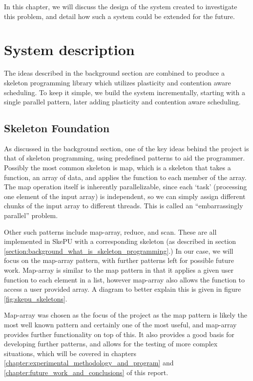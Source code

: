 
In this chapter, we will discuss the design of the system created to investigate this problem, and detail how such a system could be extended for the future.



\section{System description}

The ideas described in the background section are combined to produce a skeleton programming library which utilizes plasticity and contention aware scheduling. To keep it simple, we build the system incrementally, starting with a single parallel pattern, later adding plasticity and contention aware scheduling. 



\subsection{Skeleton Foundation}
\label{section:design_skeleton_foundation}

As discussed in the background section, one of the key ideas behind the project is that of skeleton programming, using predefined patterns to aid the programmer. Possibly the most common skeleton is map, which is a skeleton that takes a function, an array of data, and applies the function to each member of the array. The map operation itself is inherently parallelizable, since each `task' (processing one element of the input array) is independent, so we can simply assign different chunks of the input array to different threads. This is called an ``embarrassingly parallel'' problem. 

Other such patterns include map-array, reduce, and scan. These are all implemented in SkePU with a corresponding skeleton (as described in section \ref{section:background_what_is_skeleton_programming}.) In our case, we will focus on the map-array pattern, with further patterns left for possible future work. Map-array is similar to the map pattern in that it applies a given user function to each element in a list, however map-array also allows the function to access a user provided array. A diagram to better explain this is given in figure \ref{fig:skepu_skeletons}.

Map-array was chosen as the focus of the project as the map pattern is likely the most well known pattern and certainly one of the most useful, and map-array provides further functionality on top of this. It also provides a good basis for developing further patterns, and allows for the testing of more complex situations, which will be covered in chapters \ref{chapter:experimental_methodology_and_program} and \ref{chapter:future_work_and_conclusions} of this report.



